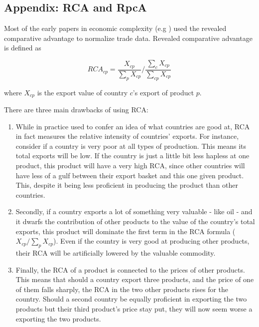 \documentclass[11pt]{article}
\begin{document}
\begin{appendices}



\newpage 

\section{Appendix: RCA and RpcA}%
\label{sec:rca}
Most of the early papers in economic complexity (e.g \citealp{tacchella_new_2012,hidalgo_building_2009}) used the revealed comparative advantage \citep{balassa_trade_1965} to normalize trade data. Revealed comparative advantage is defined as

\[
	RCA_{cp} = \frac{X_{cp}}{\sum_p X_{cp}} \bigg / \frac{\sum_c X_{cp}}{\sum_{cp} X_{cp}}
\]

where $X_{cp}$ is the export value of country $c$'s export of product $p$.

There are three main drawbacks of using RCA:

\begin{enumerate}
\item While in practice used to confer an idea of what countries are good at, RCA in fact measures the relative intensity of countries' exports. For instance, consider if a country is very poor at all types of production. This means its total exports will be low. If the country is just a little bit less hapless at one product, this product will have a very high RCA, since other countries will have less of a gulf between their export basket and this one given product. This, despite it being less proficient in producing the product than other countries.
\item Secondly, if a country exports a lot of something very valuable - like oil - and it dwarfs the contribution of other products to the value of the country's total exports, this product will dominate the first term in the RCA formula ($X_{cp} / \sum_p X_{cp}$). Even if the country is very good at producing other products, their RCA will be artificially lowered by the valuable commodity.
\item Finally, the RCA of a product is connected to the prices of other products. This means that should a country export three products, and the price of one of them falls sharply, the RCA in the two other products rises for the country. Should a second country be equally proficient in exporting the two products but their third product's price stay put, they will now seem worse a exporting the two products.
\end{enumerate}


\end{appendices}
\end{document}
